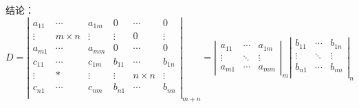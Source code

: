 {\color{blue}结论：}
$$
D={{\left| \begin{matrix}
{{a}_{11}} & \cdots  & {{a}_{1m}} & 0 & \cdots  & 0  \\
\vdots  & {m\times n} & \vdots  & \vdots  & {0} & \vdots   \\
{{a}_{m1}} & \cdots  & {{a}_{mm}} & 0 & \cdots  & 0  \\
{{c}_{11}} & \cdots  & {{c}_{1m}} & {{b}_{11}} & \cdots  & {{b}_{1n}}  \\
\vdots  & {*} & \vdots  & \vdots  & {n\times n} & \vdots   \\
{{c}_{n1}} & \cdots  & {{c}_{nm}} & {{b}_{n1}} & \cdots  & {{b}_{nn}}  \\
\end{matrix} \right|}_{m+n}}
=\left|
\begin{matrix}
a_{11} & \cdots  & a_{1m}  \\
\vdots  & \ddots & \vdots   \\
a_{m1} & \cdots  & a_{mm}
\end{matrix}\right|_{m}
\left|\begin{matrix}
b_{11} & \cdots  & b_{1n}  \\
\vdots  & \ddots & \vdots   \\
b_{n1} & \cdots  & b_{nn} \\
\end{matrix} \right|_{n}
$$
